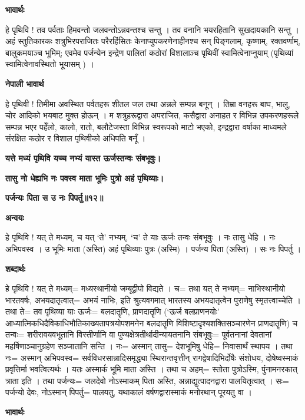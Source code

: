 \documentclass[11pt, a5paper]{article}
\begin{document}
\textbf{भावार्थः}

हे पृथिवि ! तव पर्वताः हिमवन्तो जलवन्तोऽन्नवन्तश्च सन्तु । तव वनानि भयरहितानि सुखदायकानि सन्तु । अहं स्तुतिकारकः शत्रुभिरपराजितः परैरहिंसितः केनाप्युपकरणेनाहीनश्च सन् पिङ्गलाम्, कृष्णाम्, रक्तवर्णाम्, बालुकमयाञ्च भूमिम्; एवमेव पर्जन्येन इन्द्रेण पालितां कठोरां विशालाञ्च पृथिवीं स्वामित्वेनाप्नुयाम् (पृथिव्यां स्वामित्वेनावस्थितो भूयासम् ) ।

\textbf{नेपाली भावार्थ}

हे पृथिवी ! तिमीमा अवस्थित पर्वतहरू शीतल जल तथा अन्नले सम्पन्न बनून् । तिम्रा वनहरू बाघ, भालु, चोर आदिको भयबाट मुक्त होऊन् । म शत्रुहरूद्वारा अपराजित, कसैद्वारा अनाहत र विभिन्न उपकरणहरूले सम्पन्न भएर पहेँलो, कालो, रातो, बलौटेजस्ता विभिन्न स्वरूपको माटो भएको, इन्द्रद्वारा वर्षाका माध्यमले संरक्षित कठोर र विशाल पृथिवीको अधिपति बनूँ ।

\textbf{यत्ते मध्यं पृथिवि यच्च नभ्यं यास्त ऊर्जस्तन्वः संबभूवुः।}

\textbf{तासु नो धेह्यभि नः पवस्व माता भूमिः पुत्रो अहं पृथिव्याः।}

\textbf{पर्जन्यः पिता स उ नः पिपर्तु॥१२॥}

\textbf{अन्वयः}

हे पृथिवि ! यत् ते मध्यम्, च यत् ‘ते’ नभ्यम्, ‘च’ ते याः ऊर्जः तन्वः संबभूवुः । नः तासु धेहि । नः अभिपवस्व । उ भूमिः माता (अस्ति) अहं पृथिव्याः पुत्रः (अस्मि) । पर्जन्य पिता (अस्ति) । सः नः पिपर्तु ।

\textbf{शब्दार्थः}

हे पृथिवि ! यत् ते मध्यम्= मध्यस्थानीयो जम्बूद्वीपो विद्यते । च= तथा यत् ते नभ्यम्= नाभिस्थानीयो भारतवर्षः, अभयदातृत्वात्= अभयं नाभिः, इति श्रुत्यवगमात् भारतस्य अभयदातृत्वेन पुराणेषु स्मृतत्त्वाच्चेति । तथा ते= तव पृथिव्या याः ऊर्जः= बलदातॄणि, प्राणदातॄणि (‘ऊर्ज बलप्राणनयोः’ आध्यात्मिकधिदैविकाधिभौतिकाख्यतापत्रयोपशमनेन बलदातॄणि विशिष्टादृश्यशक्तिसञ्चारणेन प्राणदातॄणि) च तन्वः= शरीरावयवभूतानि विस्तीर्णानि वा पुण्यक्षेत्रतीर्थादीन्यायतनानि संबभूवुः= पूर्वतनानां देवतानां महर्षिणाञ्चानुग्रहेण सञ्जातानि सन्ति । नः‍= अस्मान् तासु= देशभूमिषु धेहि= निवासार्थं स्थापय । तथा नः= अस्मान् अभिपवस्व= सर्वविधरसान्नादिसमृद्ध्या स्थिरान्तवृत्तीन् रागद्वेषादिभिर्दोषैः संशोधय, दोषेष्वस्माकं प्रवृत्तिर्मा भवत्वित्यर्थः । यतः अस्माकंं भूमि माता अस्ति । तथा च अहम्= स्तोता पुत्रोऽस्मि, पुंनामनरकात् त्राता इति । तथा पर्जन्यः= जलदेवो नोऽस्माकम् पिता अस्ति, अन्नाद्युत्पादनद्वारा पालयितृत्वात् । सः= पर्जन्यो देवः, नोऽस्मान् पिपर्तु= पालयतु, यथाकालं वर्षणद्वारास्माकं मनोरथान् पूरयतु वा ।

\textbf{भावार्थः}
\end{document}
